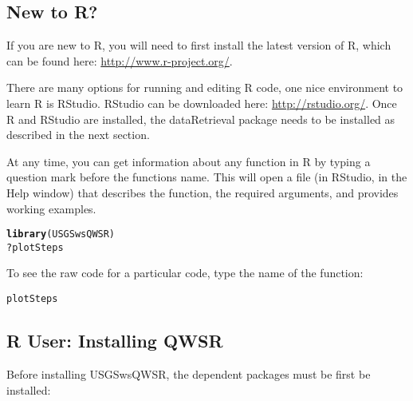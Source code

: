 \documentclass[a4paper,11pt]{article}\usepackage[]{graphicx}\usepackage[]{color}
\makeatletter
\newcommand{\hlopt}[1]{\textcolor[rgb]{0,0,0}{#1}}%
\newcommand{\hlstd}[1]{\textcolor[rgb]{0.345,0.345,0.345}{#1}}%
\newcommand{\hlkwd}[1]{\textcolor[rgb]{0.737,0.353,0.396}{\textbf{#1}}}%
\newenvironment{kframe}{%
 \def\at@end@of@kframe{}%
 \ifinner\ifhmode%
  \def\at@end@of@kframe{\end{minipage}}%
  \begin{minipage}{\columnwidth}%
 \fi\fi%
 \def\FrameCommand##1{\hskip\@totalleftmargin \hskip-\fboxsep
 \colorbox{shadecolor}{##1}\hskip-\fboxsep
     \hskip-\linewidth \hskip-\@totalleftmargin \hskip\columnwidth}%
 \MakeFramed {\advance\hsize-\width
   \@totalleftmargin\z@ \linewidth\hsize
   \@setminipage}}%
 {\par\unskip\endMakeFramed%
 \at@end@of@kframe}
\newenvironment{knitrout}{}{} %
\makeatother
\begin{document}
\subsection{New to R?}
If you are new to R, you will need to first install the latest version of R, which can be found here: \url{http://www.r-project.org/}.

There are many options for running and editing R code, one nice environment to learn R is RStudio. RStudio can be downloaded here: \url{http://rstudio.org/}. Once R and RStudio are installed, the dataRetrieval package needs to be installed as described in the next section.

At any time, you can get information about any function in R by typing a question mark before the functions name.  This will open a file (in RStudio, in the Help window) that describes the function, the required arguments, and provides working examples.

\begin{knitrout}
\color{fgcolor}\begin{kframe}
\begin{alltt}
\hlkwd{library}\hlstd{(USGSwsQWSR)}
\hlopt{?}\hlstd{plotSteps}
\end{alltt}
\end{kframe}
\end{knitrout}


To see the raw code for a particular code, type the name of the function:
\begin{knitrout}
\color{fgcolor}\begin{kframe}
\begin{alltt}
\hlstd{plotSteps}
\end{alltt}
\end{kframe}
\end{knitrout}


\subsection{R User: Installing QWSR}
Before installing USGSwsQWSR, the dependent packages must be first be installed:
\end{document}
